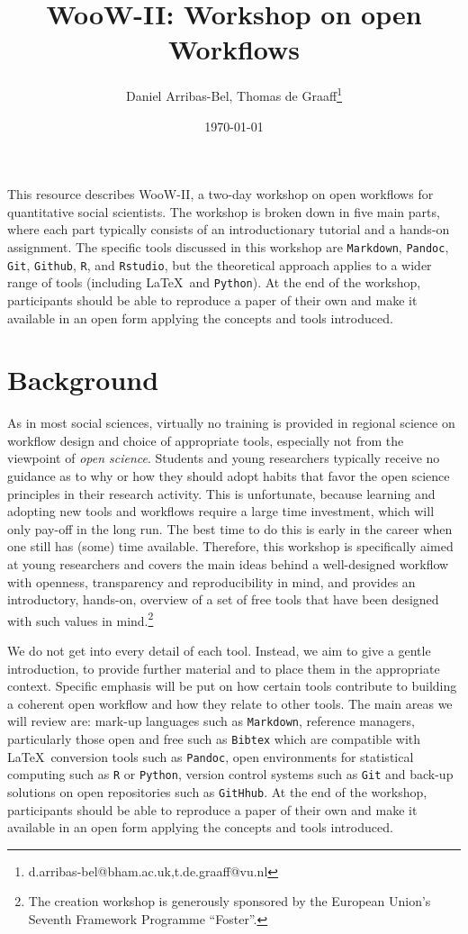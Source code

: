 \documentclass[scrartcl,a4paper,utopia,10pt]{article}
\title{WooW-II: Workshop on open Workflows}
\author{Daniel Arribas-Bel, Thomas de Graaff\thanks{d.arribas-bel@bham.ac.uk,t.de.graaff@vu.nl}}
\date{\today}
\begin{document}
\maketitle

This resource describes WooW-II, a two-day workshop on open workflows for
quantitative social scientists. The workshop is broken down in five main
parts, where each part typically consists of an introductionary tutorial and a
hands-on assignment. The specific tools discussed in this workshop are
\texttt{Markdown}, \texttt{Pandoc}, \texttt{Git}, \texttt{Github}, \texttt{R},
and \texttt{Rstudio}, but the theoretical approach applies to a wider range of
tools (including \LaTeX \, and \texttt{Python}). At the end of the workshop,
participants should be able to reproduce a paper of their own and make it
available in an open form applying the concepts and tools introduced.

\section{Background}
\label{sec-1}

As in most social sciences, virtually no training is provided in regional
science on workflow design and choice of appropriate tools, especially not
from the viewpoint of \emph{open science}. Students and young researchers
typically receive no guidance as to why or how they should adopt habits that
favor the open science principles in their research activity. This is
unfortunate, because learning and adopting new tools and workflows require a
large time investment, which will only pay-off in the long run. The best time
to do this is early in the career when one still has (some) time available.
Therefore, this workshop is specifically aimed at young researchers and covers
the main ideas behind a well-designed workflow with openness, transparency and
reproducibility in mind, and provides an introductory, hands-on, overview of a
set of free tools that have been designed with such values in
mind.\footnote{The creation workshop is generously sponsored by the European
Union's Seventh Framework Programme ``Foster''.
 }

We do not get into every detail of each tool. Instead, we aim to give a gentle
introduction, to provide further material and to place them in the appropriate
context. Specific emphasis will be put on how certain tools contribute to
building a coherent open workflow and how they relate to other tools. The main
areas we will review are: mark-up languages such as \texttt{Markdown},
reference managers, particularly those open and free such as \texttt{Bibtex}
which are compatible with \LaTeX \, conversion tools such as \texttt{Pandoc},
open environments for statistical computing such as \texttt{R} or
\texttt{Python}, version control systems such as \texttt{Git} and back-up
solutions on open repositories such as \texttt{GitHhub}. At the end of the
workshop, participants should be able to reproduce a paper of their own and
make it available in an open form applying the concepts and tools introduced.
\end{document}
